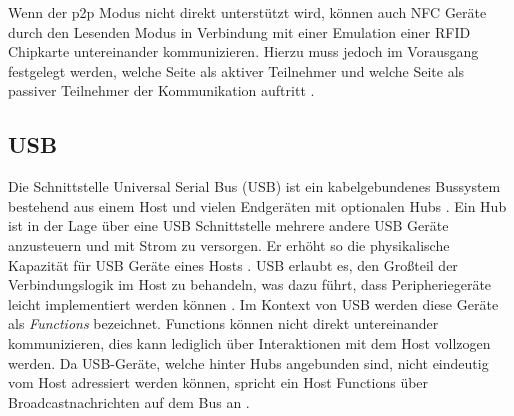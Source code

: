 	Wenn der p2p Modus nicht direkt unterstützt wird, können auch NFC Geräte durch den Lesenden Modus in Verbindung mit einer Emulation einer RFID Chipkarte untereinander kommunizieren. Hierzu muss jedoch im Vorausgang festgelegt werden, welche Seite als aktiver Teilnehmer und welche Seite als passiver Teilnehmer der Kommunikation auftritt \cite[S.101]{Langer}.
	
	\subsection{USB}
	Die Schnittstelle Universal Serial Bus (USB) ist ein kabelgebundenes Bussystem bestehend aus einem Host und vielen Endgeräten mit optionalen Hubs \cite[S.23f]{Kelm}. Ein Hub ist in der Lage über eine USB Schnittstelle mehrere andere USB Geräte anzusteuern und mit Strom zu versorgen. Er erhöht so die physikalische Kapazität für USB Geräte eines Hosts \cite[S.40]{Kelm}. USB erlaubt es, den Großteil der Verbindungslogik im Host zu behandeln, was dazu führt, dass Peripheriegeräte leicht implementiert werden können \cite[S.37]{axelson}. Im Kontext von USB werden diese Geräte als {\it Functions} bezeichnet. Functions können nicht direkt untereinander kommunizieren, dies kann lediglich über Interaktionen mit dem Host vollzogen werden. Da USB-Geräte, welche hinter Hubs angebunden sind, nicht eindeutig vom Host adressiert werden können, spricht ein Host Functions über Broadcastnachrichten auf dem Bus an \cite[S.41]{Kelm}.
	

